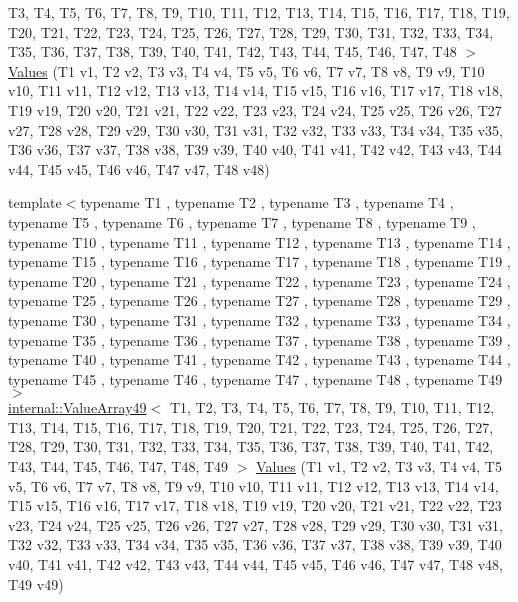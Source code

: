 \begin{DoxyCompactItemize}
\-T3, \-T4, \-T5, \-T6, \-T7, \-T8, \-T9, \*
\-T10, \-T11, \-T12, \-T13, \-T14, \-T15, \*
\-T16, \-T17, \-T18, \-T19, \-T20, \-T21, \*
\-T22, \-T23, \-T24, \-T25, \-T26, \-T27, \*
\-T28, \-T29, \-T30, \-T31, \-T32, \-T33, \*
\-T34, \-T35, \-T36, \-T37, \-T38, \-T39, \*
\-T40, \-T41, \-T42, \-T43, \-T44, \-T45, \*
\-T46, \-T47, \-T48 $>$ \hyperlink{namespacetesting_af3cdf373b137d357bb3a814c097bcd06}{\-Values} (\-T1 v1, \-T2 v2, \-T3 v3, \-T4 v4, \-T5 v5, \-T6 v6, \-T7 v7, \-T8 v8, \-T9 v9, \-T10 v10, \-T11 v11, \-T12 v12, \-T13 v13, \-T14 v14, \-T15 v15, \-T16 v16, \-T17 v17, \-T18 v18, \-T19 v19, \-T20 v20, \-T21 v21, \-T22 v22, \-T23 v23, \-T24 v24, \-T25 v25, \-T26 v26, \-T27 v27, \-T28 v28, \-T29 v29, \-T30 v30, \-T31 v31, \-T32 v32, \-T33 v33, \-T34 v34, \-T35 v35, \-T36 v36, \-T37 v37, \-T38 v38, \-T39 v39, \-T40 v40, \-T41 v41, \-T42 v42, \-T43 v43, \-T44 v44, \-T45 v45, \-T46 v46, \-T47 v47, \-T48 v48)
\item 
{\footnotesize template$<$typename T1 , typename T2 , typename T3 , typename T4 , typename T5 , typename T6 , typename T7 , typename T8 , typename T9 , typename T10 , typename T11 , typename T12 , typename T13 , typename T14 , typename T15 , typename T16 , typename T17 , typename T18 , typename T19 , typename T20 , typename T21 , typename T22 , typename T23 , typename T24 , typename T25 , typename T26 , typename T27 , typename T28 , typename T29 , typename T30 , typename T31 , typename T32 , typename T33 , typename T34 , typename T35 , typename T36 , typename T37 , typename T38 , typename T39 , typename T40 , typename T41 , typename T42 , typename T43 , typename T44 , typename T45 , typename T46 , typename T47 , typename T48 , typename T49 $>$ }\\\hyperlink{classtesting_1_1internal_1_1ValueArray49}{internal\-::\-Value\-Array49}$<$ \-T1, \-T2, \*
\-T3, \-T4, \-T5, \-T6, \-T7, \-T8, \-T9, \*
\-T10, \-T11, \-T12, \-T13, \-T14, \-T15, \*
\-T16, \-T17, \-T18, \-T19, \-T20, \-T21, \*
\-T22, \-T23, \-T24, \-T25, \-T26, \-T27, \*
\-T28, \-T29, \-T30, \-T31, \-T32, \-T33, \*
\-T34, \-T35, \-T36, \-T37, \-T38, \-T39, \*
\-T40, \-T41, \-T42, \-T43, \-T44, \-T45, \*
\-T46, \-T47, \-T48, \-T49 $>$ \hyperlink{namespacetesting_a034785cd0f04e5f5ec9e16c1cad5ccde}{\-Values} (\-T1 v1, \-T2 v2, \-T3 v3, \-T4 v4, \-T5 v5, \-T6 v6, \-T7 v7, \-T8 v8, \-T9 v9, \-T10 v10, \-T11 v11, \-T12 v12, \-T13 v13, \-T14 v14, \-T15 v15, \-T16 v16, \-T17 v17, \-T18 v18, \-T19 v19, \-T20 v20, \-T21 v21, \-T22 v22, \-T23 v23, \-T24 v24, \-T25 v25, \-T26 v26, \-T27 v27, \-T28 v28, \-T29 v29, \-T30 v30, \-T31 v31, \-T32 v32, \-T33 v33, \-T34 v34, \-T35 v35, \-T36 v36, \-T37 v37, \-T38 v38, \-T39 v39, \-T40 v40, \-T41 v41, \-T42 v42, \-T43 v43, \-T44 v44, \-T45 v45, \-T46 v46, \-T47 v47, \-T48 v48, \-T49 v49)

\end{DoxyCompactItemize}
